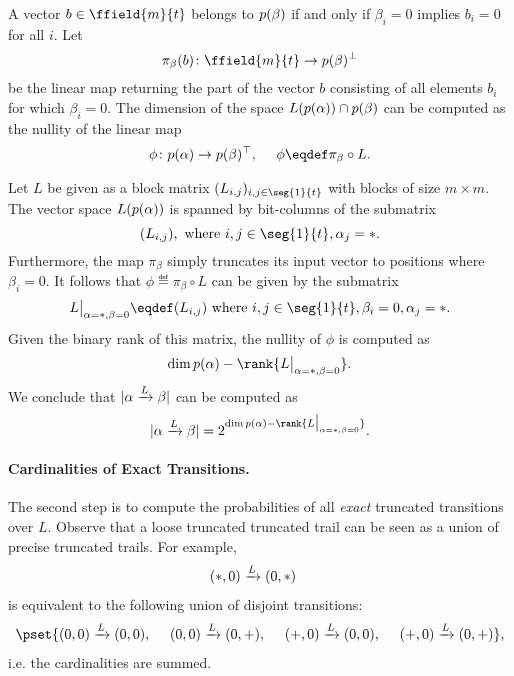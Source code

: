 A vector $b \in \ffield{m}{t}$ belongs to $p(\beta)$ if and only if $\beta_i = 0$ implies $b_i = 0$ for all $i$. Let
$$
\pi_{\beta}(b)\colon \ffield{m}{t} \to \VB^{\bot}
$$
be the linear map returning the part of the vector $b$ consisting of all elements $b_i$ for which $\beta_i=0$. The dimension of the space $L(p(\alpha))\cap p(\beta)$ can be computed as the nullity of the linear map
$$
\phi\colon \VA \to \VB^{\top},~~~~\phi \eqdef \pi_{\beta} \circ L.
$$

Let $L$ be given as a block matrix $(L_{i,j})_{i,j\in\seg{1}{t}}$ with blocks of size $m \times m$. The vector space $L(p(\alpha))$ is spanned by bit-columns of the submatrix $$
(L_{i,j}), ~\text{where}~ i,j\in\seg{1}{t},\alpha_j=\loose.
$$
\newcommand\LSUB{L\big|_{\alpha=\loose,\beta=0}}
Furthermore, the map $\pi_{\beta}$ simply truncates its input vector to positions where $\beta_i = 0$. It follows that $\phi \eqdef \pi_{\beta} \circ L$ can be given by the submatrix
$$
\LSUB \eqdef (L_{i,j})~\text{where}~ i,j\in\seg{1}{t},\beta_i=0,\alpha_j=\loose.
$$
Given the binary rank of this matrix, the nullity of $\phi$ is computed as
$$
\dim{\VA}-\rank{\LSUB}.
$$
We conclude that $|\alpha \xrightarrow{L} \beta|$ can be computed as
$$
|\alphabeta| = 2^{\dim{p(\alpha)} - \rank{\LSUB}}.
$$

\paragraph{Cardinalities of Exact Transitions.}
The second step is to compute the probabilities of all \emph{exact} truncated transitions over $L$. Observe that a loose truncated truncated trail can be seen as a union of precise truncated trails. For example,
\begin{align*}
    &(*, 0) \xrightarrow{L} (0, *) 
\end{align*}
is equivalent to the following union of disjoint transitions:
\begin{align*}
        \pset{
        (0, 0) \xrightarrow{L} (0, 0),~~~~
        (0, 0) \xrightarrow{L} (0, \exact),~~~~
        (\exact, 0) \xrightarrow{L} (0, 0),~~~~
        (\exact, 0) \xrightarrow{L} (0, \exact)},
\end{align*}
i.e. the cardinalities are summed.

\newcommand\alphabetap{\alpha' \xrightarrow{L} \beta'}
\newcommand\alphabetaex{\alpha_{\exact} \xrightarrow{L} \beta_{\exact}}
\newcommand\alphabetaexp{\alpha_{\exact}' \xrightarrow{L} \beta_{\exact}'}
\newcommand\alphabetalo{\alpha_{\loose} \xrightarrow{L} \beta_{\loose}}


